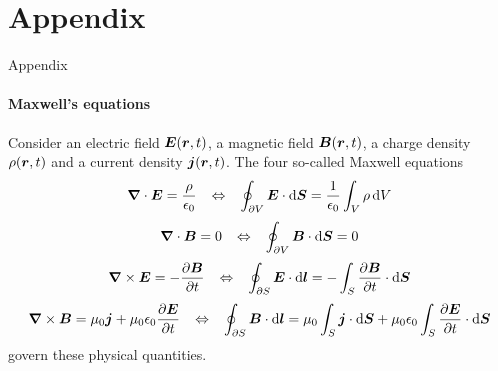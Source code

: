 \documentclass{beamer}
\begin{document}
\section*{Appendix}
\begin{frame}[allowframebreaks]{Appendix}
\framesubtitle{Maxwell's equations}
\justifying
Consider an electric field $\bm{E}(\bm{r},t)$, a magnetic field $\bm{B}(\bm{r},t)$, a charge density $\rho(\bm{r},t)$ and a current density $\bm{j}(\bm{r},t)$. The four so-called Maxwell equations \begin{equation}\scriptsize
	\bm{\nabla}\cdot \bm{E} = \frac{\rho}{\epsilon_0} \quad \Leftrightarrow \quad \oint_{\partial V} \bm{E}\cdot \mathrm{d}\bm{S} = \frac{1}{\epsilon_0}\int_{V}\rho\,\mathrm{d}V
	\end{equation}
	\begin{equation}\scriptsize
	\bm{\nabla}\cdot \bm{B} = 0 \quad \Leftrightarrow \quad \oint_{\partial V}\bm{B}\cdot \mathrm{d}\bm{S} = 0
	\end{equation}
	\begin{equation}\scriptsize
	\bm{\nabla} \times \bm{E} = - \frac{\partial \bm{B}}{\partial t} \quad \Leftrightarrow \quad \oint_{\partial S}\bm{E}\cdot \mathrm{d}\bm{l} = -\int_{S}\frac{\partial \bm{B}}{\partial t}\cdot \mathrm{d}\bm{S}
	\end{equation}
	\begin{equation}\scriptsize
	\bm{\nabla} \times \bm{B} = \mu_0\bm{j} + \mu_0\epsilon_0\frac{\partial \bm{E}}{\partial t} \quad \Leftrightarrow \quad \oint_{\partial S}\bm{B}\cdot \mathrm{d}\bm{l} = \mu_0\int_{S}\bm{j}\cdot \mathrm{d}\bm{S} + \mu_0\epsilon_0\int_{S}\frac{\partial \bm{E}}{\partial t}\cdot \mathrm{d}\bm{S}
	\end{equation} govern these physical quantities.
\end{frame}
\end{document}
